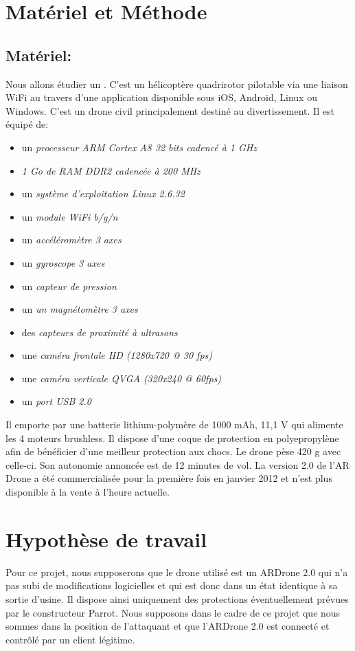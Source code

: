 \section{Matériel et Méthode}
\subsection{Matériel: }
Nous allons étudier un . C'est un hélicoptère quadrirotor pilotable via une liaison WiFi au travers d'une application disponible sous iOS, Android, Linux ou Windows. C'est un drone civil principalement destiné au divertissement. Il est équipé de:
\medbreak
\begin{itemize}
    \item un \textit{processeur ARM Cortex A8 32 bits cadencé à 1 GHz}
    \item \textit{1 Go de RAM DDR2 cadencée à 200 MHz}
    \item un \textit{système d'exploitation Linux 2.6.32}
    \item un \textit{module WiFi b/g/n}
    \item un \textit{accéléromètre 3 axes}
    \item un \textit{gyroscope 3 axes}
    \item un \textit{capteur de pression}
    \item un \textit{un magnétomètre 3 axes}
    \item des \textit{capteurs de proximité à ultrasons}
    \item une \textit{caméra frontale HD (1280x720 @ 30 fps)}
    \item une \textit{caméra verticale QVGA (320x240 @ 60fps)}
    \item un \textit{port USB 2.0}
\end{itemize}
\medbreak
Il emporte par une batterie lithium-polymère de 1000 mAh, 11,1 V qui alimente les 4 moteurs brushless. Il dispose d'une coque de protection en polyepropylène afin de bénéficier d'une meilleur protection aux chocs. Le drone pèse 420 g avec celle-ci. Son autonomie annoncée est de 12 minutes de vol. La version 2.0 de l'AR Drone a été commercialisée pour la première fois en janvier 2012 et n'est plus disponible à la vente à l'heure actuelle.


\section{Hypothèse de travail}
Pour ce projet, nous supposerons que le drone utilisé est un ARDrone 2.0 qui n'a pas subi de modifications logicielles et qui est donc dans un état identique à sa sortie d'usine. Il dispose ainsi uniquement des protections éventuellement prévues par le constructeur Parrot. Nous supposons dans le cadre de ce projet que nous sommes  dans la position de l'attaquant et que l'ARDrone 2.0 est connecté et contrôlé par un client légitime.
